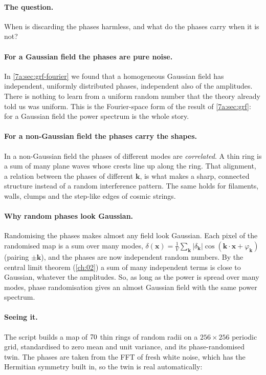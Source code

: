\paragraph{The question.} When is discarding the phases harmless, and what do the
phases carry when it is not?

\paragraph{For a Gaussian field the phases are pure noise.}
In \cref{7a:sec:grf-fourier} we found that a homogeneous Gaussian field has
independent, uniformly distributed phases, independent also of the amplitudes.
There is nothing to learn from a uniform random number that the theory already
told us was uniform. This is the Fourier-space form of the result of
\cref{7a:sec:grf}: for a Gaussian field the power spectrum is the whole story.

\paragraph{For a non-Gaussian field the phases carry the shapes.}
In a non-Gaussian field the phases of different modes are \emph{correlated}. A
thin ring is a sum of many plane waves whose crests line up along the ring. That
alignment, a relation between the phases of different $\bm k$, is what makes a
sharp, connected structure instead of a random interference pattern. The same
holds for filaments, walls, clumps and the step-like edges of cosmic strings.

\paragraph{Why random phases look Gaussian.}
Randomising the phases makes almost any field look Gaussian. Each pixel of the
randomised map is a sum over many modes,
$\delta(\bm x)=\frac1V\sum_{\bm k}|\delta_{\bm k}|\cos(\bm k\cdot\bm x+\varphi_{\bm k})$
(pairing $\pm\bm k$), and the phases are now independent random numbers. By the
central limit theorem (\cref{ch:02}) a sum of many independent terms is close to
Gaussian, whatever the amplitudes. So, as long as the power is spread over many
modes, phase randomisation gives an almost Gaussian field with the same power
spectrum.

\paragraph{Seeing it.}
The script  builds a map of $70$ thin rings
of random radii on a $256\times256$ periodic grid, standardised to zero mean and unit
variance, and its phase-randomised twin. The phases are taken from the FFT of
fresh white noise, which has the Hermitian symmetry built in, so the twin is real
automatically:

